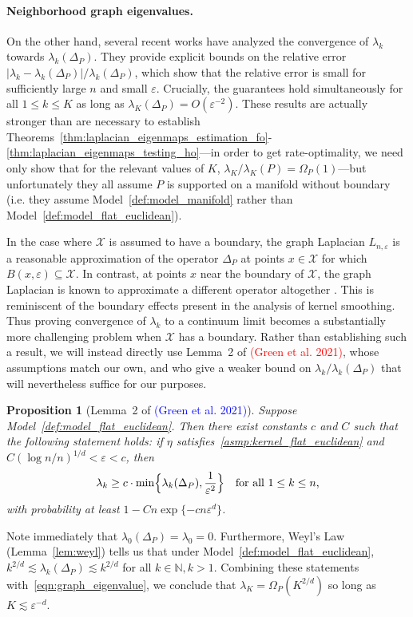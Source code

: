 \documentclass{article}
\newcommand{\1}{\mathbf{1}}
\newcommand{\mc}[1]{\mathcal{#1}}
\theoremstyle{alden}
\theoremstyle{aldenthm}
\newtheorem{proposition}{Proposition}
\theoremstyle{definition}
\theoremstyle{remark}
\begin{document}
\paragraph{Neighborhood graph eigenvalues.}
On the other hand, several recent works \citep{burago2014,garciatrillos18,calder2019} have analyzed the convergence of $\lambda_{k}$ towards $\lambda_{k}(\Delta_P)$. They provide explicit bounds on the relative error $|\lambda_{k} - \lambda_{k}(\Delta_P)|/\lambda_{k}(\Delta_P)$, which show that the relative error is small for sufficiently large $n$ and small $\varepsilon$. Crucially, the guarantees hold simultaneously for all $1 \leq k \leq K$ as long as $\lambda_{K}(\Delta_P) = O(\varepsilon^{-2})$. These results are actually stronger than are necessary to establish Theorems~\ref{thm:laplacian_eigenmaps_estimation_fo}-\ref{thm:laplacian_eigenmaps_testing_ho}---in order to get rate-optimality, we need only show that for the relevant values of $K$, $\lambda_{K}/\lambda_K(P) = \Omega_P(1)$---but unfortunately they all assume $P$ is supported on a manifold without boundary (i.e. they assume Model~\ref{def:model_manifold} rather than Model~\ref{def:model_flat_euclidean}). 

In the case where $\mc{X}$ is assumed to have a boundary, the graph Laplacian $L_{n,\varepsilon}$ is a reasonable approximation of the operator $\Delta_P$ at points $x \in \mc{X}$ for which $B(x,\varepsilon) \subseteq \mc{X}$. In contrast, at points $x$ near the boundary of $\mc{X}$, the graph Laplacian is known to approximate a different operator altogether \citep{belkin2012}. This is reminiscent of the boundary effects present in the analysis of kernel smoothing. Thus proving convergence of $\lambda_k$ to a continuum limit becomes a substantially more challenging problem when $\mc{X}$ has a boundary. Rather than establishing such a result, we will instead directly use Lemma~2 of \textcolor{red}{(Green et al. 2021)}, whose assumptions match our own, and who give a weaker bound on $\lambda_k/\lambda_k(\Delta_P)$ that will nevertheless suffice for our purposes. 

\begin{proposition}[Lemma~2 of \textcolor{blue}{(Green et al. 2021)}]
	\label{prop:graph_eigenvalue}
	Suppose Model~\ref{def:model_flat_euclidean}. Then there exist constants $c$ and $C$ such that the following statement holds: if $\eta$ satisfies~\ref{asmp:kernel_flat_euclidean} and $C(\log n/n)^{1/d} < \varepsilon < c$, then
	\begin{equation}
	\label{eqn:graph_eigenvalue}
	\lambda_k \geq c \cdot \min\Bigl\{\lambda_k(\Delta_P), \frac{1}{\varepsilon^{2}} \Bigr\} \quad \textrm{for all $1 \leq k \leq n$,}
	\end{equation}
	with probability at least $1 - Cn\exp\{-c n\varepsilon^d\}$. 
\end{proposition}
Note immediately that $\lambda_0(\Delta_P) = \lambda_0 = 0$. Furthermore, Weyl's Law (Lemma~\ref{lem:weyl}) tells us that under Model~\ref{def:model_flat_euclidean}, $k^{2/d} \lesssim \lambda_{k}(\Delta_P) \lesssim k^{2/d}$ for all $k \in \mathbb{N}, k > 1$. Combining these statements with~\eqref{eqn:graph_eigenvalue}, we conclude that $\lambda_{K} = \Omega_P(K^{2/d})$ so long as $K \lesssim \varepsilon^{-d}$. 
\end{document}
